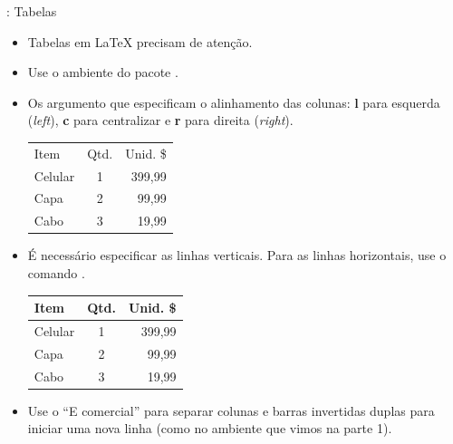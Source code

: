 \documentclass{beamer}
\begin{document}
\begin{frame}[fragile]{\insertsection: Tabelas}
\begin{itemize}
\item Tabelas em \LaTeX{} precisam de atenção.
\item Use o ambiente  do pacote .
\item Os argumento que especificam o alinhamento das colunas: \textbf{l} para esquerda (\emph{left}), \textbf{c} para centralizar e \textbf{r} para direita (\emph{right}).
\begin{exampletwouptiny}
\begin{tabular}{lcr}
Item    & Qtd. & Unid. \$ \\
Celular & 1    & 399,99  \\
Capa    & 2    & 99,99  \\
Cabo    & 3    & 19,99   \\
\end{tabular}
\end{exampletwouptiny}
\item É necessário especificar as linhas verticais. Para as linhas horizontais,  use o
comando .
\begin{exampletwouptiny}
\begin{tabular}{|l|c|r|} \hline
Item    & Qtd. & Unid. \$ \\\hline
Celular & 1    & 399,99  \\
Capa    & 2    & 99,99  \\
Cabo    & 3    & 19,99   \\\hline
\end{tabular}
\end{exampletwouptiny}
\item Use o ``E comercial''  \keystrokebftt{\&} para separar colunas e barras
invertidas duplas \keystrokebftt{\bs}\keystrokebftt{\bs} para iniciar uma nova
linha (como no ambiente   que vimos na parte 1).
\end{itemize}
\end{frame}
\end{document}
